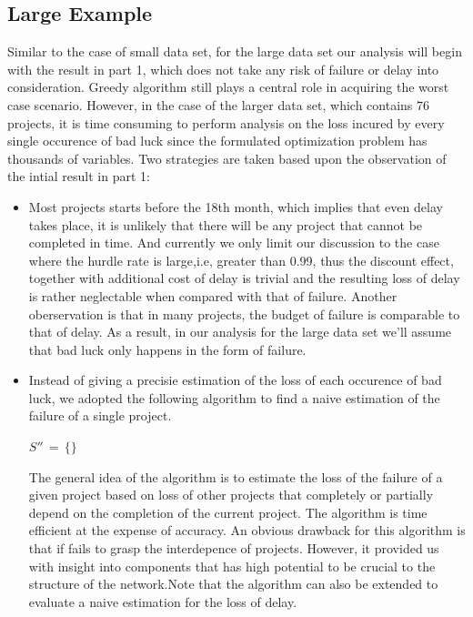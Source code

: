 \documentclass[final,3p,times]{elsarticle}
\begin{document}
\subsection{Large Example}
Similar to the case of small data set, for the large data set our analysis will begin with the result in part 1, which does not take any risk of failure or delay into consideration. Greedy algorithm still plays a central role in acquiring the worst case scenario. However, in the case of the larger data set, which contains 76 projects, it is time consuming to perform analysis on the loss incured by every single occurence of bad luck since the formulated optimization problem has thousands of variables. Two strategies are taken based upon the observation of the intial result in part 1:
\begin{itemize}
\item Most projects starts before the 18th month, which implies that even delay takes place, it is unlikely that there will be any project that cannot be completed in time. And currently we only limit our discussion to the case where the hurdle rate is large,i.e, greater than 0.99, thus the discount effect, together with additional cost of delay is trivial and the resulting loss of delay is rather neglectable when compared with that of failure. Another oberservation is that in many projects, the budget of failure is comparable to that of delay. As a result, in our analysis for the large data set we'll assume that bad luck only happens in the form of failure.
\item Instead of giving a precisie estimation of the loss of each occurence of bad luck, we adopted the following algorithm to find a naive estimation of the failure of a single project.
\begin{algorithm}
$S''\,=\,\{\}$\;
\end{algorithm}
The general idea of the algorithm is to estimate the loss of the failure of a given project based on loss of other projects that completely or partially depend on the completion of the current project. The algorithm is time efficient at the expense of accuracy. An obvious drawback for this algorithm is that if fails to grasp the interdepence of projects. However, it provided us with insight into components that has high potential to be crucial to the structure of the network.Note that the algorithm can also be extended to evaluate a naive estimation for the loss of delay.
\end{itemize}
\end{document}
